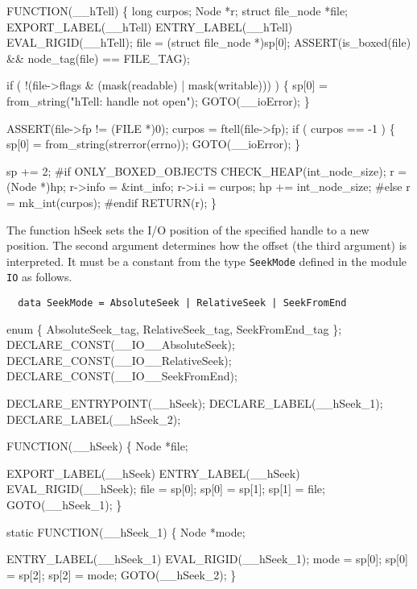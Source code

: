 FUNCTION(__hTell)
\{
    long             curpos;
    Node             *r;
    struct file_node *file;
    EXPORT_LABEL(__hTell)
 ENTRY_LABEL(__hTell)
    EVAL_RIGID(__hTell);
    file = (struct file_node *)sp[0];
    ASSERT(is_boxed(file) && node_tag(file) == FILE_TAG);

    if ( !(file->flags & (mask(readable) | mask(writable))) )
    \{
        sp[0] = from_string("hTell: handle not open");
        GOTO(__ioError);
    \}

    ASSERT(file->fp != (FILE *)0);
    curpos = ftell(file->fp);
    if ( curpos == -1 )
    \{
        sp[0] = from_string(strerror(errno));
        GOTO(__ioError);
    \}

    sp += 2;
#if ONLY_BOXED_OBJECTS
    CHECK_HEAP(int_node_size);
    r       = (Node *)hp;
    r->info = &int_info;
    r->i.i  = curpos;
    hp     += int_node_size;
#else
    r = mk_int(curpos);
#endif
    RETURN(r);
\}

\nwendcode{}\nwdocspar
The function {\Tt{}hSeek\nwendquote} sets the I/O position of the specified handle
to a new position. The second argument determines how the offset
(the third argument) is interpreted. It must be a constant from the
type \texttt{SeekMode} defined in the module \texttt{IO} as follows.
\begin{verbatim}
  data SeekMode = AbsoluteSeek | RelativeSeek | SeekFromEnd
\end{verbatim}

\nwenddocs{}\plusendmoddef\nwstartdeflinemarkup{}\nwenddeflinemarkup
enum \{ AbsoluteSeek_tag, RelativeSeek_tag, SeekFromEnd_tag \};
DECLARE_CONST(__IO__AbsoluteSeek);
DECLARE_CONST(__IO__RelativeSeek);
DECLARE_CONST(__IO__SeekFromEnd);

DECLARE_ENTRYPOINT(__hSeek);
DECLARE_LABEL(__hSeek_1);
DECLARE_LABEL(__hSeek_2);

FUNCTION(__hSeek)
\{
    Node *file;

    EXPORT_LABEL(__hSeek)
 ENTRY_LABEL(__hSeek)
    EVAL_RIGID(__hSeek);
    file  = sp[0];
    sp[0] = sp[1];
    sp[1] = file;
    GOTO(__hSeek_1);
\}

static
FUNCTION(__hSeek_1)
\{
    Node *mode;

 ENTRY_LABEL(__hSeek_1)
    EVAL_RIGID(__hSeek_1);
    mode  = sp[0];
    sp[0] = sp[2];
    sp[2] = mode;
    GOTO(__hSeek_2);
\}


